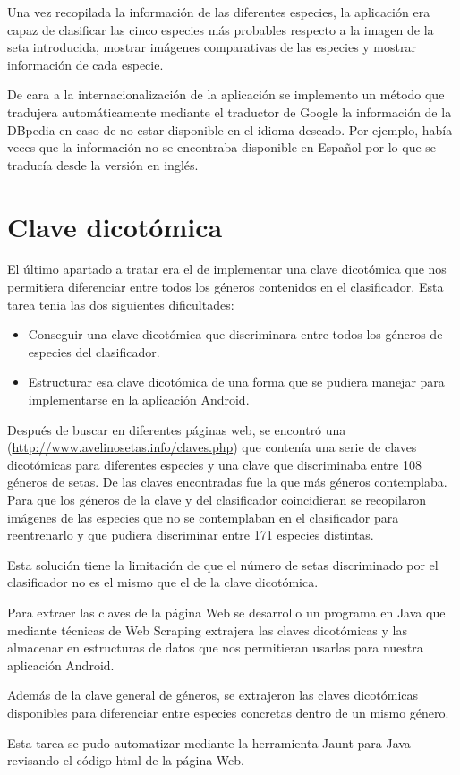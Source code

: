 Una vez recopilada la información de las diferentes especies, la aplicación era capaz de clasificar las cinco especies más probables respecto a la imagen de la seta introducida, mostrar imágenes comparativas de las especies y mostrar información de cada especie.

De cara a la internacionalización de la aplicación se implemento un método que tradujera automáticamente mediante el traductor de Google la información de la DBpedia en caso de no estar disponible en el idioma deseado. Por ejemplo, había veces que la información no se encontraba disponible en Español por lo que se traducía desde la versión en inglés.

\section{Clave dicotómica}

El último apartado a tratar era el de implementar una clave dicotómica que nos permitiera diferenciar entre todos los géneros contenidos en el clasificador. Esta tarea tenia las dos siguientes dificultades:

\begin{itemize}
	\item Conseguir una clave dicotómica que discriminara entre todos los géneros de especies del clasificador.
	\item Estructurar esa clave dicotómica de una forma que se pudiera manejar para implementarse en la aplicación Android.
\end{itemize}

Después de buscar en diferentes páginas web, se encontró una (\url{http://www.avelinosetas.info/claves.php}) que contenía una serie de claves dicotómicas para diferentes especies y una clave que discriminaba entre 108 géneros de setas. De las claves encontradas fue la que más géneros contemplaba. Para que los géneros de la clave y del clasificador coincidieran se recopilaron imágenes de las especies que no se contemplaban en el clasificador para reentrenarlo y que pudiera discriminar entre 171 especies distintas.

Esta solución tiene la limitación de que el número de setas discriminado por el clasificador no es el mismo que el de la clave dicotómica.

Para extraer las claves de la página Web se desarrollo un programa en Java que mediante técnicas de Web Scraping extrajera las claves dicotómicas y las almacenar en estructuras de datos que nos permitieran usarlas para nuestra aplicación Android.

Además de la clave general de géneros, se extrajeron las claves dicotómicas disponibles para diferenciar entre especies concretas dentro de un mismo género.

Esta tarea se pudo automatizar mediante la herramienta Jaunt para Java revisando el código html de la página Web.










